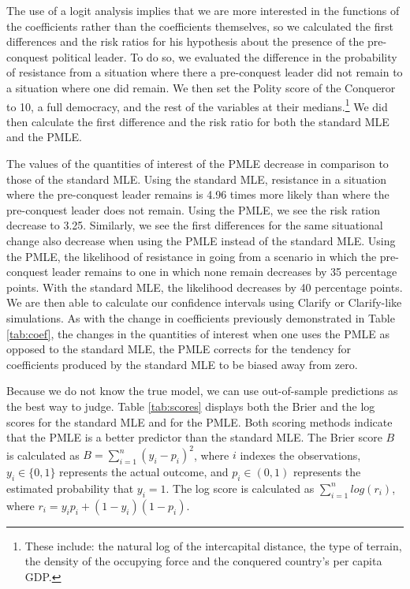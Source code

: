 \documentclass[12pt]{article}
\begin{document}
The use of a logit analysis implies that we are more interested in the functions of the coefficients rather than the coefficients themselves, so we calculated the first differences and the risk ratios for his hypothesis about the presence of the pre-conquest political leader. To do so, we evaluated the difference in the probability of resistance from a situation where there a pre-conquest leader did not remain to a situation where one did remain. We then set the Polity score of the Conqueror to 10, a full democracy, and the rest of the variables at their medians.\footnote{These include: the natural log of the intercapital distance, the type of terrain, the density of the occupying force and the conquered country's per capita GDP.} We did then calculate the first difference and the risk ratio for both the standard MLE and the PMLE.

The values of the quantities of interest of the PMLE decrease in comparison to those of the standard MLE. Using the standard MLE, resistance in a situation where the pre-conquest leader remains is 4.96 times more likely than where the pre-conquest leader does not remain. Using the PMLE, we see the risk ration decrease to 3.25. Similarly, we see the first differences for the same situational change also decrease when using the PMLE instead of the standard MLE. Using the PMLE, the likelihood of resistance in going from a scenario in which the pre-conquest leader remains to one in which none remain decreases by 35 percentage points. With the standard MLE, the likelihood decreases by 40 percentage points. We are then able to calculate our confidence intervals using Clarify or Clarify-like simulations. As with the change in coefficients previously demonstrated in Table \ref{tab:coef}, the changes in the quantities of interest when one uses the PMLE as opposed to the standard MLE, the PMLE corrects for the tendency for coefficients produced by the standard MLE to be biased away from zero.

Because we do not know the true model, we can use out-of-sample predictions as the best way to judge. Table \ref{tab:scores} displays both the Brier and the log scores for the standard MLE and for the PMLE. Both scoring methods indicate that the PMLE is a better predictor than the standard MLE. The Brier score $B$ is calculated as $B = \sum_{i = 1}^n (y_i - p_i)^2$, where $i$ indexes the observations, $y_i \in \{0, 1\}$ represents the actual outcome, and $p_i \in (0, 1)$ represents the estimated probability that $y_i = 1$. The log score is calculated as $\sum_{i = 1}^n log(r_i)$, where $r_i = y_i p_i + (1 - y_i)(1 - p_i)$. 
\end{document}
